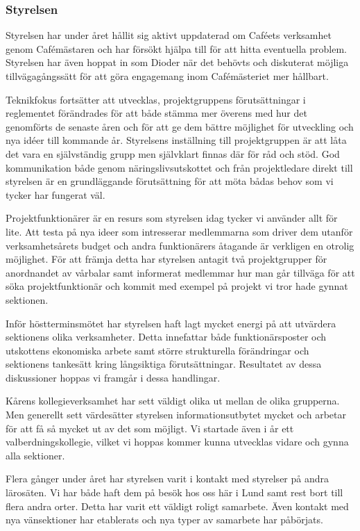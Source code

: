 \documentclass[../_main/handlingar.tex]{subfiles}
\begin{document}

\subsubsection*{Styrelsen}

Styrelsen har under året hållit sig aktivt uppdaterad om Caféets verksamhet genom Cafémästaren och har försökt hjälpa till för att hitta eventuella problem. Styrelsen har även hoppat in som Dioder när det behövts och diskuterat möjliga tillvägagångssätt för att göra engagemang inom Cafémästeriet mer hållbart. 

Teknikfokus fortsätter att utvecklas, projektgruppens förutsättningar i reglementet förändrades för att både stämma mer överens med hur det genomförts  de senaste åren och för att ge dem bättre möjlighet för utveckling och nya idéer till kommande år. Styrelsens inställning till projektgruppen är att låta det vara en självständig grupp men självklart finnas där för råd och stöd. God kommunikation både genom näringslivsutskottet och från projektledare direkt till styrelsen är en grundläggande förutsättning för att möta bådas behov som vi tycker har fungerat väl.  

Projektfunktionärer är en resurs som styrelsen idag tycker vi använder allt för lite. Att testa på nya ideer som intresserar medlemmarna som driver dem utanför verksamhetsårets budget och andra funktionärers åtagande är verkligen en otrolig möjlighet. För att främja detta har styrelsen antagit två projektgrupper för anordnandet av vårbalar samt informerat medlemmar hur man går tillväga för att söka projektfunktionär och kommit med exempel på projekt vi tror hade gynnat sektionen.

Inför höstterminsmötet har styrelsen haft lagt mycket energi på att utvärdera sektionens olika verksamheter. Detta innefattar både funktionärsposter och utskottens ekonomiska arbete samt större strukturella förändringar och sektionens tankesätt kring långsiktiga förutsättningar. Resultatet av dessa diskussioner hoppas vi framgår i dessa handlingar. 

Kårens kollegieverksamhet har sett väldigt olika ut mellan de olika grupperna. Men generellt sett värdesätter styrelsen informationsutbytet mycket och arbetar för att få så mycket ut av det som möjligt. Vi startade även i år ett valberdningskollegie, vilket vi hoppas kommer kunna utvecklas vidare och gynna alla sektioner.

Flera gånger under året har styrelsen varit i kontakt med styrelser på andra lärosäten. Vi har både haft dem på besök hos oss här i Lund samt rest bort till flera andra orter. Detta har varit  ett väldigt roligt samarbete. Även kontakt med nya vänsektioner har etablerats och nya typer av samarbete har påbörjats. 
\end{document}
